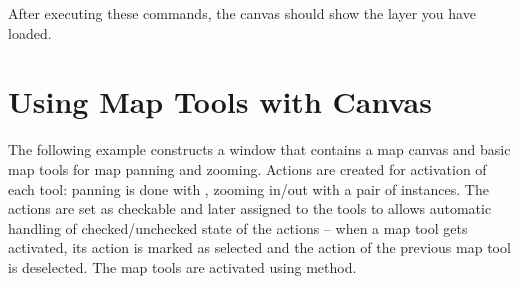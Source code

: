 \documentclass[letterpaper,10pt,english]{manual}
\begin{document}
After executing these commands, the canvas should show the layer you have loaded.


\section{Using Map Tools with Canvas}

The following example constructs a window that contains a map canvas and basic
map tools for map panning and zooming.  Actions are created for activation of
each tool: panning is done with , zooming in/out with a
pair of  instances. The actions are set as checkable and
later assigned to the tools to allows automatic handling of checked/unchecked
state of the actions -- when a map tool gets activated, its action is marked as
selected and the action of the previous map tool is deselected. The map tools
are activated using  method.
\end{document}
